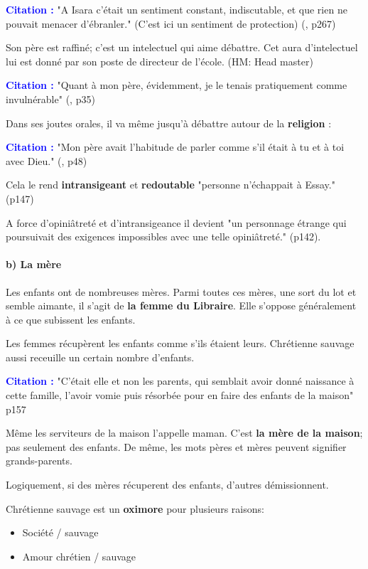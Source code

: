 \documentclass[a4paper, 11pt, hidelinks]{article}
\newcommand{\bs}{\bigskip}
\newcommand{\cit}{\large \textcolor{blue}{\textbf{Citation :}} \large }
\newcommand{\rb}[1]{\Romanbar{#1}}
\begin{document}
\cit"A Isara c'était un sentiment constant, indiscutable, et que rien ne pouvait menacer d'ébranler." (C'est ici un sentiment de protection) (\rb{9}, p267)
\bs

Son père est raffiné; c'est un intelectuel qui aime débattre. Cet aura d'intelectuel lui est donné par son poste de directeur de l'école. (HM: Head master)

\cit "Quant à mon père, évidemment, je le tenais pratiquement comme invulnérable" (\rb{1}, p35)

\smallskip
Dans ses joutes orales, il va même jusqu'à débattre autour de la \textbf{religion} :

\cit "Mon père avait l'habitude de parler comme s'il était à tu et à toi avec Dieu." (\rb{1}, p48)

\smallskip
Cela le rend \textbf{intransigeant} et \textbf{redoutable} "personne n'échappait à Essay." (p147)

A force d'opiniâtreté et d'intransigeance il devient "un personnage étrange qui poursuivait des exigences impossibles avec une telle opiniâtreté." (p142).





\paragraph{b) La mère}



Les enfants ont de nombreuses mères. Parmi toutes ces mères, une sort du lot et semble aimante, il s'agit de \textbf{la femme du Libraire}. 
Elle s'oppose généralement à ce que subissent les enfants.

\bs

Les femmes récupèrent les enfants comme s'ils étaient leurs.
Chrétienne sauvage aussi receuille un certain nombre d'enfants.

\cit "C'était elle et non les parents, qui semblait avoir donné naissance à cette famille, l'avoir vomie puis résorbée pour en faire des enfants de la maison" \rb{6} p157
\bs

Même les serviteurs de la maison l'appelle maman. C'est \textbf{la mère de la maison}; pas seulement des enfants.
De même, les mots pères et mères peuvent signifier grands-parents. 

\bs
Logiquement, si des mères récuperent des enfants, d'autres démissionnent.

\bs
Chrétienne sauvage est un \textbf{oximore} pour plusieurs raisons: 
\begin{itemize}
    \item Société / sauvage
    \item Amour chrétien / sauvage
\end{itemize}
\bs
\end{document}

